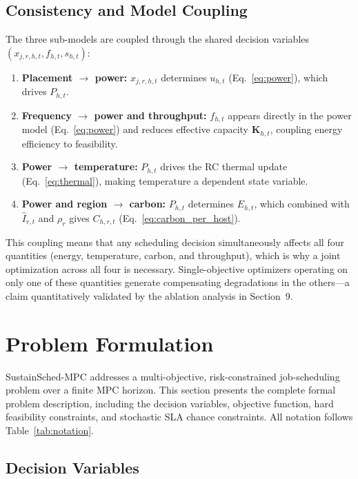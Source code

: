 \documentclass[a4paper,fleqn]{cas-dc}
\begin{document}
\subsection{Consistency and Model Coupling}
\label{sec:model_coupling}

The three sub-models are coupled through the shared decision variables $(x_{j,r,h,t}, f_{h,t}, s_{h,t})$:
\begin{enumerate}
  \item \textbf{Placement $\to$ power:} $x_{j,r,h,t}$ determines $u_{h,t}$ (Eq.~\eqref{eq:power}), which drives $P_{h,t}$.
  \item \textbf{Frequency $\to$ power and throughput:} $f_{h,t}$ appears directly in the power model (Eq.~\eqref{eq:power}) and reduces effective capacity $\mathbf{K}_{h,t}$, coupling energy efficiency to feasibility.
  \item \textbf{Power $\to$ temperature:} $P_{h,t}$ drives the RC thermal update (Eq.~\eqref{eq:thermal}), making temperature a dependent state variable.
  \item \textbf{Power and region $\to$ carbon:} $P_{h,t}$ determines $E_{h,t}$, which combined with $\hat{I}_{r,t}$ and $\rho_r$ gives $C_{h,r,t}$ (Eq.~\eqref{eq:carbon_per_host}).
\end{enumerate}
This coupling means that any scheduling decision simultaneously affects all four quantities (energy, temperature, carbon, and throughput), which is why a joint optimization across all four is necessary. Single-objective optimizers operating on only one of these quantities generate compensating degradations in the others---a claim quantitatively validated by the ablation analysis in Section~9.

\section{Problem Formulation}
\label{sec:formulation}

SustainSched-MPC addresses a multi-objective, risk-constrained job-scheduling problem over a finite MPC horizon. This section presents the complete formal problem description, including the decision variables, objective function, hard feasibility constraints, and stochastic SLA chance constraints. All notation follows Table~\ref{tab:notation}.

\subsection{Decision Variables}
\label{sec:decvars}
\end{document}
